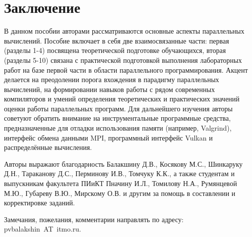 \section*{Заключение}

В данном пособии авторами рассматриваются основные аспекты параллельных вычислений. Пособие включает в себя две взаимосвязанные части: первая (разделы 1-4) посвящена теоретической подготовке обучающихся, вторая (разделы 5-10) связана с практической подготовкой выполнения лабораторных работ на базе первой части в области параллельного программирования. Акцент делается на преодолении порога вхождения в парадигму параллельных вычислений, на формировании навыков работы с рядом современных компиляторов и умений определения теоретических и практических значений оценки работы параллельных программ. Для дальнейшего изучения авторы советуют обратить внимание на инструментальные программные средства, предназначенные для отладки использования памяти (например, Valgrind), интерфейс обмена данными MPI, программный интерфейс Vulkan и распределённые вычисления.

Авторы выражают благодарность Балакшину Д.В., Косякову М.С., Шинкаруку Д.Н., Тараканову Д.С., Перминову И.В., Томчуку К.К., а также студентам и выпускникам факультета ПИиКТ Пначину И.Л., Томилову Н.А., Румянцевой М.Ю., Губареву В.Ю., Мирскому О.В. и другим за помощь в составлении и корректировке заданий.

Замечания, пожелания, комментарии направлять по адресу: pvbalakshin~AT~itmo.ru. 
